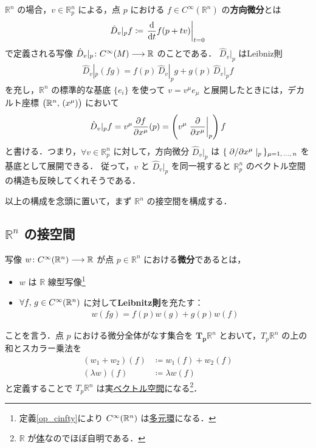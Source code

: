 \documentclass[geometry_main]{subfiles}
\begin{document}
$\mathbb{R}^n$ の場合，$v \in \mathbb{R}^n_p$ による，点 $p$ における $f \in C^\infty (\mathbb{R}^n)$ の\textbf{方向微分}とは
\begin{align}
	\label{eq:directional}
	\hat{D}_{v}|_p f \coloneqq \eval{\dv{}{t}() f(p + tv)}_{t=0}
\end{align}
で定義される写像 $\hat{D}_v|_p \colon C^\infty (M) \longrightarrow \mathbb{R}$ のことである．
$\hat{D}_v|_p$ はLeibniz則
\begin{align}
	\hat{D}_v|_p (fg) = f(p)\, \hat{D}_v|_p g + g(p)\, \hat{D}_v|_p f
\end{align}
を充し，$\mathbb{R}^n$ の標準的な基底 $\{e_i\}$ を使って $v = v^\mu e_\mu$ と展開したときには，デカルト座標 $\bigl(\mathbb{R}^n,\, (x^\mu)\bigr)$ において
\begin{align}
	\hat{D}_v|_p f = v^\mu \pdv{f}{x^\mu}() (p) = \left( v^\mu \eval{\pdv{}{x^\mu}}_p \right) f
\end{align}
と書ける．つまり，$\forall v \in \mathbb{R}^n_p$ に対して，方向微分 $\hat{D}_v|_p$ は $\{\, \pdv*{}{x^\mu}|_p\, \}_{\mu = 1,\, \dots,\, n}$ を基底として展開できる．
従って，$v$ と $\hat{D}_v|_p$ を同一視すると $\mathbb{R}^n_p$ のベクトル空間の構造も反映してくれそうである．

以上の構成を念頭に置いて，まず $\mathbb{R}^n$ の接空間を構成する．

\subsection{$\mathbb{R}^n$ の接空間}

写像 $w \colon C^\infty(\mathbb{R}^n) \longrightarrow \mathbb{R}$ が点 $p \in \mathbb{R}^n$ における\textbf{微分}であるとは，
\begin{itemize}
	\item $w$ は $\mathbb{R}$ 線型写像\footnote{定義\ref{op_cinfty}により $C^\infty(\mathbb{R}^n)$ は\hyperref[ax.alg]{多元環}になる．}
	\item $\forall f,\, g \in C^\infty(\mathbb{R}^n)$ に対して\textbf{Leibnitz則}を充たす：
	\begin{align}
		w(fg) = f(p) w(g) + g(p) w(f)
	\end{align}
\end{itemize}
ことを言う．点 $p$ における微分全体がなす集合を $\bm{T_p} \mathbb{R}^n$ とおいて，$T_p \mathbb{R}^n$ の上の和とスカラー乗法を
\begin{align}
	(w_1 + w_2)(f) &\coloneqq w_1(f) + w_2(f) \\
	(\lambda w)(f) &\coloneqq \lambda w(f)
\end{align}
と定義することで $T_p \mathbb{R}^n$ は実\hyperref[ax.vector]{ベクトル空間}になる\footnote{$\mathbb{R}$ が\hyperref[ax.ring]{体}なのでほぼ自明である．}．
\end{document}
